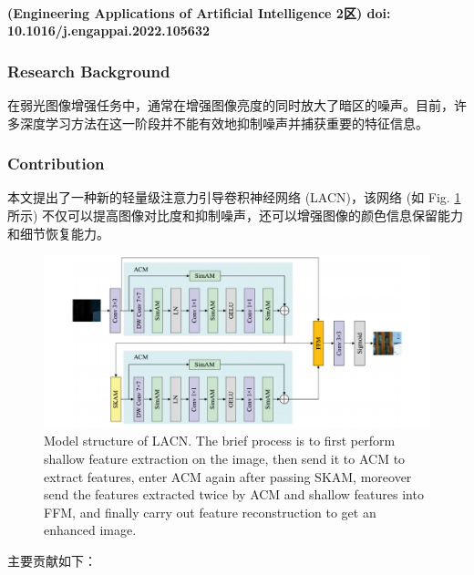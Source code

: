 \documentclass[a4paper, 10pt]{article}
\begin{document}
		\paragraph{(Engineering Applications of Artificial Intelligence 2区) doi: 10.1016/j.engappai.2022.105632}
			
			\subsubsection{Research Background}
				
			在弱光图像增强任务中，通常在增强图像亮度的同时放大了暗区的噪声。目前，许多深度学习方法在这一阶段并不能有效地抑制噪声并捕获重要的特征信息。
			
			\subsubsection{Contribution}
			
			本文提出了一种新的轻量级注意力引导卷积神经网络 (LACN)，该网络 (如 Fig. \ref{fig: LACN model structure} 所示) 不仅可以提高图像对比度和抑制噪声，还可以增强图像的颜色信息保留能力和细节恢复能力。
			
			\begin{figure}[htbp]
				\centering 
				\includegraphics[width=\columnwidth]{picture/LLIE/LACN/LACN model structure}
				\caption{
					\label{fig: LACN model structure} 
					Model structure of LACN. The brief process is to first perform shallow feature extraction on the image, then send it to ACM to extract features, enter ACM again after passing SKAM, moreover send the features extracted twice by ACM and shallow features into FFM, and finally carry out feature reconstruction to get an enhanced image.
				}
			\end{figure}
			
			主要贡献如下：
			
\end{document}
